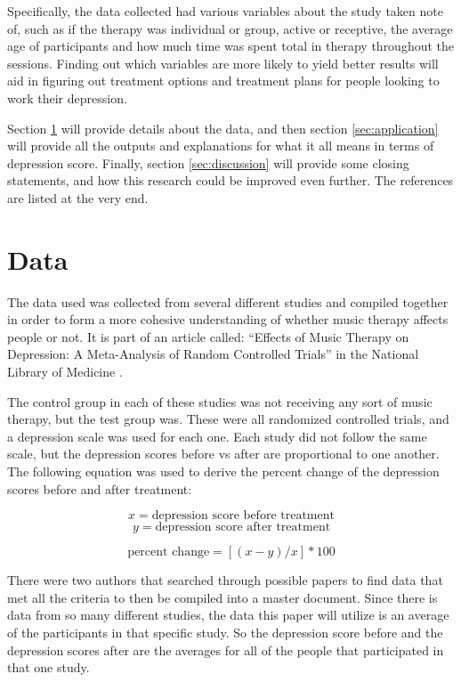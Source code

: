 \documentclass[12pt]{article}
\begin{document}
 Specifically, the data collected had various variables about the study taken note of, such as if the therapy was individual or group, active or receptive, the average age of participants and how much time was spent total in therapy throughout the sessions. Finding out which variables are more likely to yield better results will aid in figuring out treatment options and treatment plans for people looking to work their depression.

 Section \ref{sec:data} will provide details about the data, and then section \ref{sec:application} will provide all the outputs and explanations for what it all means in terms of depression score. Finally, section \ref{sec:discussion} will provide some closing statements, and how this research could be improved even further. The references are listed at the very end.

 \section{Data} 
 \label{sec:data}

 The data used was collected from several different studies and compiled together in order to form a more cohesive understanding of whether music therapy affects people or not. It is part of an article called: “Effects of Music Therapy on Depression: A Meta-Analysis of Random Controlled Trials” in the National Library of Medicine \citet{PLOS}. 

 The control group in each of these studies was not receiving any sort of music therapy, but the test group was. These were all randomized controlled trials, and a depression scale was used for each one. Each study did not follow the same scale, but the depression scores before vs after are proportional to one another. The following equation was used to derive the percent change of the depression scores before and after treatment:

 $$x = \text{depression score before treatment}$$
 $$y = \text{depression score after treatment}$$

 $$\text{percent change} = [(x-y)/x]*100$$ 
 
 There were two authors that searched through possible papers to find data that met all the criteria to then be compiled into a master document. Since there is data from so many different studies, the data this paper will utilize is an average of the participants in that specific study. So the depression score before and the depression scores after are the averages for all of the people that participated in that one study. 
 
\end{document}
